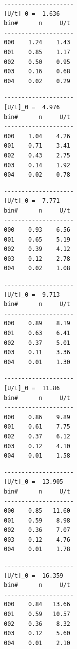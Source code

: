 \documentclass[11pt,letter]{article}
\begin{document}
{\small

\begin{minipage}[b][10em][b]{0.25\textwidth}
\begin{verbatim}
--------------------
[U/t]_0 =  1.636
bin#      n     U/t
--------------------
000    1.24    1.43
001    0.85    1.17
002    0.50    0.95
003    0.16    0.68
004    0.02    0.29
\end{verbatim}
\end{minipage}
\begin{minipage}[b][10em][b]{0.25\textwidth}
\begin{verbatim}
--------------------
[U/t]_0 =  4.976
bin#      n     U/t
--------------------
000    1.04    4.26
001    0.71    3.41
002    0.43    2.75
003    0.14    1.92
004    0.02    0.78
\end{verbatim}
\end{minipage}
\begin{minipage}[b][10em][b]{0.25\textwidth}
\begin{verbatim}
--------------------
[U/t]_0 =  7.771
bin#      n     U/t
--------------------
000    0.93    6.56
001    0.65    5.19
002    0.39    4.12
003    0.12    2.78
004    0.02    1.08
\end{verbatim}
\end{minipage}
\begin{minipage}[b][10em][b]{0.25\textwidth}
\begin{verbatim}
--------------------
[U/t]_0 =  9.713
bin#      n     U/t
--------------------
000    0.89    8.19
001    0.63    6.41
002    0.37    5.01
003    0.11    3.36
004    0.01    1.30
\end{verbatim}
\end{minipage}

\vspace{1em}

\begin{minipage}[b][10em][b]{0.25\textwidth}
\begin{verbatim}
--------------------
[U/t]_0 =  11.86
bin#      n     U/t
--------------------
000    0.86    9.89
001    0.61    7.75
002    0.37    6.12
003    0.12    4.10
004    0.01    1.58
\end{verbatim}
\end{minipage}
\begin{minipage}[b][10em][b]{0.25\textwidth}
\begin{verbatim}
--------------------
[U/t]_0 =  13.905
bin#      n     U/t
--------------------
000    0.85   11.60
001    0.59    8.98
002    0.36    7.07
003    0.12    4.76
004    0.01    1.78
\end{verbatim}
\end{minipage}
\begin{minipage}[b][10em][b]{0.25\textwidth}
\begin{verbatim}
--------------------
[U/t]_0 =  16.359
bin#      n     U/t
--------------------
000    0.84   13.66
001    0.59   10.57
002    0.36    8.32
003    0.12    5.60
004    0.01    2.10
\end{verbatim}
\end{minipage}

}
\end{document}
